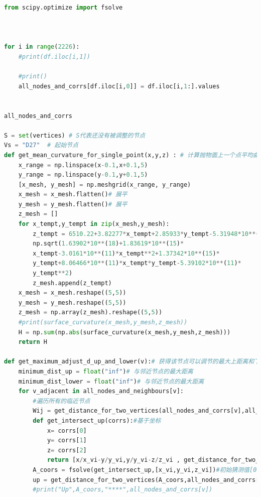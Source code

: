 \documentclass[withoutpreface,bwprint]{cumcmthesis} %
\begin{document}
\begin{appendices}
\begin{lstlisting}[language=python]
    from scipy.optimize import fsolve



for i in range(2226):
    #print(df.iloc[i,1])

    #print()
    all_nodes_and_corrs[df.iloc[i,0]] = df.iloc[i,1:].values

    
all_nodes_and_corrs    

S = set(vertices) # S代表还没有被调整的节点
Vs = "D27"  # 起始节点
def get_mean_curvature_for_single_point(x,y,z) : # 计算抛物面上一个点平均曲率
    x_range = np.linspace(x-0.1,x+0.1,5)
    y_range = np.linspace(y-0.1,y+0.1,5)
    [x_mesh, y_mesh] = np.meshgrid(x_range, y_range)
    x_mesh = x_mesh.flatten()# 展平
    y_mesh = y_mesh.flatten()# 展平
    z_mesh = [] 
    for x_tempt,y_tempt in zip(x_mesh,y_mesh):
        z_tempt = 6510.22+3.82277*x_tempt+2.85933*y_tempt-5.31948*10**(-6)*
        np.sqrt(1.63902*10**(18)+1.83619*10**(15)*
        x_tempt-3.0161*10**(11)*x_tempt**2+1.37342*10**(15)*
        y_tempt+8.06466*10**(11)*x_tempt*y_tempt-5.39102*10**(11)*
        y_tempt**2)
        z_mesh.append(z_tempt)
    x_mesh = x_mesh.reshape((5,5))
    y_mesh = y_mesh.reshape((5,5))
    z_mesh = np.array(z_mesh).reshape((5,5))
    #print(surface_curvature(x_mesh,y_mesh,z_mesh))
    H = np.sum(np.abs(surface_curvature(x_mesh,y_mesh,z_mesh)))
    return H

def get_maximum_adjust_d_up_and_lower(v):# 获得该节点可以调节的最大上距离和下距离
    minimum_dist_up = float("inf")# 与邻近节点的最大距离
    minimum_dist_lower = float("inf")# 与邻近节点的最大距离
    for v_adjacent in all_nodes_and_neighbours[v]:
        #遍历所有的临近节点
        Wij = get_distance_for_two_vertices(all_nodes_and_corrs[v],all_nodes_and_corrs[v_adjacent])
        def get_intersect_up(corrs):#基于坐标
            x= corrs[0]
            y= corrs[1]
            z= corrs[2]
            return [x/x_vi-y/y_vi,y/y_vi-z/z_vi , get_distance_for_two_vertices([x,y,z],all_nodes_and_corrs[v_adjacent])-Wij*(1-0.0007)]
        A_coors = fsolve(get_intersect_up,[x_vi,y_vi,z_vi])#初始猜测值[0,-1]
        up = get_distance_for_two_vertices(A_coors,all_nodes_and_corrs[v])
        #print("Up",A_coors,"****",all_nodes_and_corrs[v])
        

\end{lstlisting}
\end{appendices}
\end{document}
